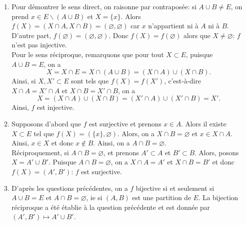 \documentclass[11pt,a4paper]{article}
\begin{document}
	\begin{corrige}
		\begin{enumerate}
			
			\item  Pour démontrer le sens direct, on raisonne par contraposée: si $A\cup B\neq E$, on prend
			$x\in E\backslash (A\cup B)$ et $X=\{x\}$. Alors $f(X)=(X\cap A,X\cap B)=(\varnothing,\varnothing)$ 
			car $x$ n'appartient ni à $A$ ni à $B$. D'autre part, $f(\varnothing)=(\varnothing,\varnothing)$. Donc
			$f(X)=f(\varnothing)$ alors que $X\neq\varnothing$: $f$ n'est pas injective.\\
			
			Pour le sens réciproque, remarquons que pour tout $X\subset E$, puisque $A\cup B=E$, on a 
			$$X=X\cap E=X\cap(A\cup B)=(X\cap A)\cup(X\cap B).$$
			Ainsi, si $X,X'\subset E$ sont tels que $f(X)=f(X')$, c'est-à-dire $X\cap A=X'\cap A$
			et $X\cap B=X'\cap B$, on a
			$$X=(X\cap A)\cup(X\cap B)=(X'\cap A)\cup(X'\cap B)=X'.$$
			Ainsi, $f$ est injective.
			
			\item  Supposons d'abord que $f$ est surjective et prenons $x\in A$.
			Alors il existe $X\subset E$ tel que $f(X)=(\{x\},\varnothing)$. 
			Alors, on a $X\cap B=\varnothing$ et $x\in X\cap A$. Ainsi, $x\in X$
			et donc $x\notin B$. Ainsi, on a $A\cap B=\varnothing$.\\
			
			Réciproquement, si $A\cap B=\varnothing$, et prenons $A'\subset A$ et
			$B'\subset B$. Alors, posons $X=A'\cup B'$. Puisque $A\cap B=\varnothing$,
			on a $X\cap A=A'$ et $X\cap B=B'$ et donc $f(X)=(A',B')$: $f$ est surjective.
			
			\item  D'après les questions précédentes, 
			on a $f$ bijective si et seulement si $A\cup B=E$ et $A\cap B=\varnothing$,
			ie si $(A,B)$ est une partition de $E$. La bijection réciproque
			a été établie à la question précédente et est donnée par
			$(A',B')\mapsto A'\cup B'$.
			
		\end{enumerate}
	\end{corrige}
	
\end{document}

